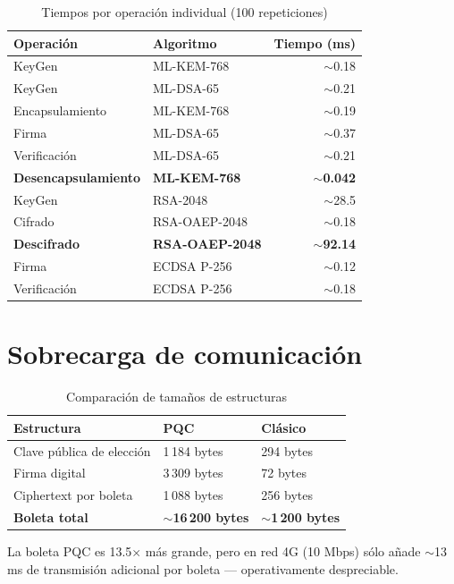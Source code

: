 \documentclass[12pt,a4paper,twoside,openright]{book}
\theoremstyle{plain}
\theoremstyle{definition}
\theoremstyle{remark}
\begin{document}
\begin{table}[H]
\centering
\caption{Tiempos por operaci\'on individual (100 repeticiones)}
\label{tab:microbench}
\begin{tabular}{llr}
\toprule
\textbf{Operaci\'on} & \textbf{Algoritmo} & \textbf{Tiempo (ms)} \\
\midrule
KeyGen & ML-KEM-768 & $\sim$0.18 \\
KeyGen & ML-DSA-65 & $\sim$0.21 \\
Encapsulamiento & ML-KEM-768 & $\sim$0.19 \\
Firma & ML-DSA-65 & $\sim$0.37 \\
Verificaci\'on & ML-DSA-65 & $\sim$0.21 \\
\textbf{Desencapsulamiento} & \textbf{ML-KEM-768} & $\sim$\textbf{0.042} \\
\midrule
KeyGen & RSA-2048 & $\sim$28.5 \\
Cifrado & RSA-OAEP-2048 & $\sim$0.18 \\
\textbf{Descifrado} & \textbf{RSA-OAEP-2048} & $\sim$\textbf{92.14} \\
Firma & ECDSA P-256 & $\sim$0.12 \\
Verificaci\'on & ECDSA P-256 & $\sim$0.18 \\
\bottomrule
\end{tabular}
\end{table}

\section{Sobrecarga de comunicaci\'on}

\begin{table}[H]
\centering
\caption{Comparaci\'on de tama\~nos de estructuras}
\label{tab:tamanos}
\begin{tabular}{lll}
\toprule
\textbf{Estructura} & \textbf{PQC} & \textbf{Cl\'asico} \\
\midrule
Clave p\'ublica de elecci\'on & 1\,184 bytes & 294 bytes \\
Firma digital & 3\,309 bytes & 72 bytes \\
Ciphertext por boleta & 1\,088 bytes & 256 bytes \\
\textbf{Boleta total} & \textbf{$\sim$16\,200 bytes} & \textbf{$\sim$1\,200 bytes} \\
\bottomrule
\end{tabular}
\end{table}

La boleta PQC es 13.5$\times$ m\'as grande, pero en red 4G (10 Mbps) s\'olo
a\~nade $\sim$13\,ms de transmisi\'on adicional por boleta --- operativamente
despreciable.
\end{document}
